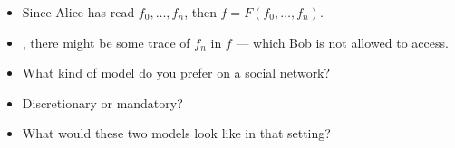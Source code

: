 \begin{frame}
  \begin{remark}
    \begin{itemize}
      \item Since Alice has read \(f_0, \dotsc, f_n\), then \(f = F(f_0, 
          \dotsc, f_n)\).
      \item \Ie, there might be some trace of \(f_n\) in \(f\) --- which Bob is 
        not allowed to access.
    \end{itemize}
  \end{remark}
\end{frame}

\begin{frame}
  \begin{exercise}
    \begin{itemize}
      \item What kind of model do you prefer on a social network?
      \item Discretionary or mandatory?
      \item What would these two models look like in that setting?
    \end{itemize}
  \end{exercise}
\end{frame}


